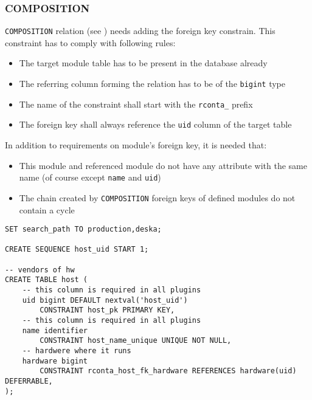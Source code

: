 \documentclass[deska]{subfiles}
\begin{document}
\subsubsection{COMPOSITION}
{\tt COMPOSITION} relation (see ) needs adding the foreign key constrain. This constraint has to comply with following rules:
\begin{itemize}
    \item The target module table has to be present in the database already
    \item The referring column forming the relation has to be of the {\tt bigint} type
    \item The name of the constraint shall start with the {\tt rconta\_} prefix
    \item The foreign key shall always reference the {\tt uid} column of the target table
\end{itemize}
In addition to requirements on module's foreign key, it is needed that:
\begin{itemize}
    \item This module and referenced module do not have any attribute with the same name (of course except {\tt name} and {\tt uid})
    \item The chain created by {\tt COMPOSITION} foreign keys of defined modules do not contain a cycle
\end{itemize}

\begin{verbatim}
SET search_path TO production,deska;

CREATE SEQUENCE host_uid START 1;

-- vendors of hw
CREATE TABLE host (
    -- this column is required in all plugins
    uid bigint DEFAULT nextval('host_uid')
        CONSTRAINT host_pk PRIMARY KEY,
    -- this column is required in all plugins
    name identifier
        CONSTRAINT host_name_unique UNIQUE NOT NULL,
    -- hardwere where it runs
    hardware bigint
        CONSTRAINT rconta_host_fk_hardware REFERENCES hardware(uid) DEFERRABLE,
);
\end{verbatim}
\end{document}
